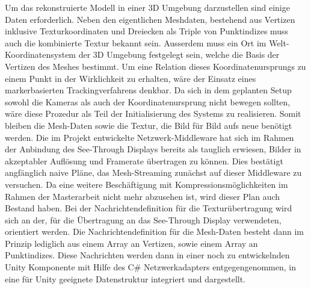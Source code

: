 Um das rekonstruierte Modell in einer 3D Umgebung darzustellen sind einige Daten 
erforderlich. Neben den eigentlichen Meshdaten, bestehend aus Vertizen inklusive 
Texturkoordinaten und Dreiecken als Triple von Punktindizes muss auch die 
kombinierte Textur bekannt sein. Ausserdem muss ein Ort im Welt-Koordinatensystem 
der 3D Umgebung festgelegt sein, welche die Basis der Vertizen des Meshes bestimmt.
Um eine Relation dieses Koordinatenursprungs zu einem Punkt in der Wirklichkeit zu 
erhalten, wäre der Einsatz eines markerbasierten Trackingverfahrens denkbar. Da sich 
in dem geplanten Setup sowohl die Kameras als auch der Koordinatenursprung nicht 
bewegen sollten, wäre diese Prozedur als Teil der Initialisierung des Systems zu 
realisieren. Somit bleiben die Mesh-Daten sowie die Textur, die Bild für Bild aufs 
neue benötigt werden. Die im Projekt entwickelte Netzwerk-Middleware hat sich im 
Rahmen der Anbindung des See-Through Displays bereits als tauglich erwiesen, Bilder 
in akzeptabler Auflösung und Framerate übertragen zu können. Dies bestätigt 
angfänglich naive Pläne, das Mesh-Streaming zunächst auf dieser Middleware zu 
versuchen. Da eine weitere Beschäftigung mit Kompressionsmöglichkeiten im Rahmen der 
Masterarbeit nicht mehr abzusehen ist, wird dieser Plan auch Bestand haben. Bei der 
Nachrichtendefinition für die Texturübertragung wird sich an der, für die 
Übertragung an das See-Through Display verwendeten, orientiert werden. Die 
Nachrichtendefinition für die Mesh-Daten besteht dann im Prinzip lediglich aus einem 
Array an Vertizen, sowie einem Array an Punktindizes. Diese Nachrichten werden dann 
in einer noch zu entwickelnden Unity Komponente mit Hilfe des C\# Netzwerkadapters 
entgegengenommen, in eine für Unity geeignete Datenstruktur integriert und 
dargestellt.
